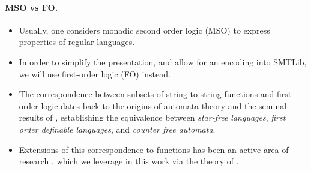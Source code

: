 \paragraph{MSO vs FO.} 
\begin{itemize}
  \item Usually, one considers monadic second order logic (MSO) to express properties of
    regular languages.
  \item In order to simplify the presentation, and allow for an encoding into
    SMTLib, we will use first-order logic (FO) instead.
  \item 
The correspondence between subsets of string to string
functions and first order logic dates back to the origins of automata theory
and the seminal results of \cite{PEPI86,SCHU65,MNPA71}, establishing the
equivalence between \emph{star-free languages}, \emph{first order definable
languages}, and \emph{counter free automata}.
  \item Extensions of this correspondence
to functions has been an active area of research \cite{CADA15,MUSC19}, which we
leverage in this work via the theory of 
\cite{ENMA02,bojanczyk2018polyregular,bojanczyk2019string,bojanczyk2023growth}.
\end{itemize}


